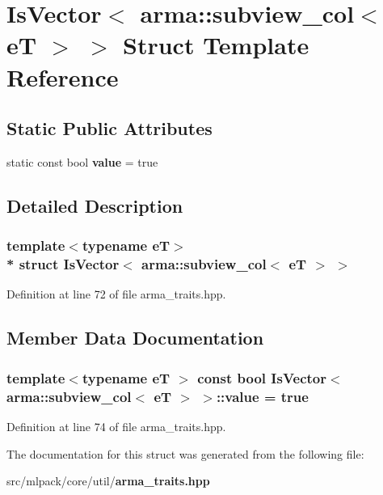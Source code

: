 \section{Is\+Vector$<$ arma\+:\+:subview\+\_\+col$<$ eT $>$ $>$ Struct Template Reference}
\label{structIsVector_3_01arma_1_1subview__col_3_01eT_01_4_01_4}
\subsection*{Static Public Attributes}
\begin{DoxyCompactItemize}
\item 
static const bool {\bf value} = true
\end{DoxyCompactItemize}


\subsection{Detailed Description}
\subsubsection*{template$<$typename eT$>$\\*
struct Is\+Vector$<$ arma\+::subview\+\_\+col$<$ e\+T $>$ $>$}



Definition at line 72 of file arma\+\_\+traits.\+hpp.



\subsection{Member Data Documentation}
\subsubsection[{value}]{\setlength{\rightskip}{0pt plus 5cm}template$<$typename eT $>$ const bool {\bf Is\+Vector}$<$ arma\+::subview\+\_\+col$<$ eT $>$ $>$\+::value = true\hspace{0.3cm}{\ttfamily [static]}}\label{structIsVector_3_01arma_1_1subview__col_3_01eT_01_4_01_4_ad456570d0b6fd307d1e3f71265ea385f}


Definition at line 74 of file arma\+\_\+traits.\+hpp.



The documentation for this struct was generated from the following file\+:\begin{DoxyCompactItemize}
\item 
src/mlpack/core/util/{\bf arma\+\_\+traits.\+hpp}\end{DoxyCompactItemize}
